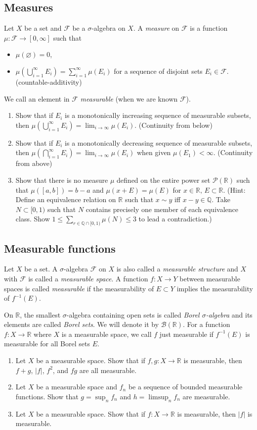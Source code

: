 \documentclass{article}
\def\R{\mathbb{R}}
\def\cF{\mathcal{F}}
\def\cB{\mathcal{B}}
\begin{document}
\subsection*{Measures}
Let $X$ be a set and $\cF$ be a $\sigma$-algebra on $X$.
A \emph{measure} on $\cF$ is a function $\mu:\cF\to[0,\infty]$ such that
\begin{itemize}
\item $\mu(\varnothing)=0$,
\item $\mu(\bigcup_{i=1}^\infty E_i)=\sum_{i=1}^\infty\mu(E_i)$ for a sequence of disjoint sets $E_i\in\cF$. (countable-additivity)
\end{itemize}
We call an element in $\cF$ \emph{measurable} (when we are known $\cF$).
\begin{enumerate}
\item Show that if $E_i$ is a monotonically increasing sequence of measurable subsets, then $\mu(\bigcup_{i=1}^\infty E_i)=\lim_{i\to\infty}\mu(E_i)$. (Continuity from below)
\item Show that if $E_i$ is a monotonically decreasing sequence of measurable subsets, then $\mu(\bigcap_{i=1}^\infty E_i)=\lim_{i\to\infty}\mu(E_i)$ when given $\mu(E_1)<\infty$. (Continuity from above)
\item Show that there is no measure $\mu$ defined on the entire power set $\mathcal{P}(\R)$ such that $\mu([a,b])=b-a$ and $\mu(x+E)=\mu(E)$ for $x\in\R,\,E\subset\R$. (Hint: Define an equivalence relation on $\R$ such that $x\sim y$ iff $x-y\in\mathbb{Q}$. Take $N\subset[0,1)$ such that $N$ contains precisely one member of each equivalence class. Show $1\le\sum_{r\in\mathbb{Q}\cap[0,1)}\mu(N)\le3$ to lead a contradiction.)
\end{enumerate}

\subsection*{Measurable functions}
Let $X$ be a set.
A $\sigma$-algebra $\cF$ on $X$ is also called a \emph{measurable structure} and $X$ with $\cF$ is called a \emph{measurable space}.
A function $f:X\to Y$ between measurable spaces is called \emph{measurable} if the measurability of $E\subset Y$ implies the measurability of $f^{-1}(E)$.

On $\R$, the smallest $\sigma$-algebra containing open sets is called \emph{Borel $\sigma$-algebra} and its elements are called \emph{Borel sets}.
We will denote it by $\cB(\R)$.
For a function $f:X\to\R$ where $X$ is a measurable space, we call $f$ just measurable if $f^{-1}(E)$ is measurable for all Borel sets $E$.

\begin{enumerate}
\item Let $X$ be a measurable space. Show that if $f,g:X\to\R$ is measurable, then $f+g$, $|f|$, $f^2$, and $fg$ are all measurable.
\item Let $X$ be a measurable space and $f_n$ be a sequence of bounded measurable functions. Show that $g=\sup_nf_n$ and $h=\limsup_nf_n$ are measurable.
\item Let $X$ be a measurable space. Show that if $f:X\to\R$ is measurable, then $|f|$ is measurable.
\end{enumerate}
\end{document}
